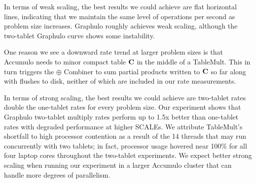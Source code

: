 In terms of weak scaling, the best results we could achieve are flat horizontal lines, 
indicating that we maintain the same level of operations per second as problem size increases.
Graphulo roughly achieves weak scaling, although the two-tablet Graphulo curve 
shows some instability.

One reason we see a downward rate trend at larger problem sizes is that Accumulo
needs to minor compact table $\mathbf{C}$ in the middle of a TableMult. This in turn triggers 
the $\oplus$ Combiner to sum partial products written to $\mathbf{C}$ so far
along with flushes to disk, neither of which are included
in our rate measurements. %

In terms of strong scaling, the best results we could achieve are two-tablet rates
double the one-tablet rates for every problem size.
Our experiment shows that Graphulo two-tablet multiply rates perform up to 1.5x better
than one-tablet rates with degraded performance at higher SCALEs.  
We attribute TableMult's shortfall to high processor contention as a result of 
the 14 threads that may run concurrently with two tablets; in fact,
processor usage hovered near 100\% for all four laptop cores throughout the two-tablet experiments.
We expect better strong scaling when running our experiment 
in a larger Accumulo cluster that can handle more degrees of parallelism.

